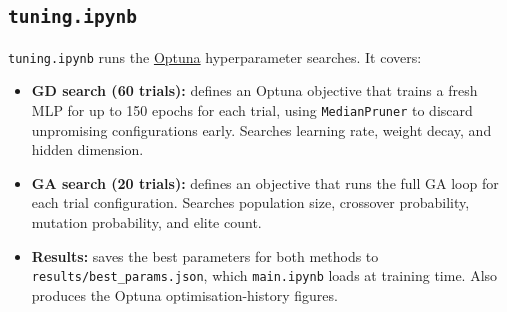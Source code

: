 \documentclass[11pt,a4paper]{article}
\begin{document}
\subsection{\texttt{tuning.ipynb}}

\texttt{tuning.ipynb} runs the \href{https://optuna.org}{Optuna} hyperparameter searches. It
covers:
\begin{itemize}
    \item \textbf{GD search (60 trials):} defines an Optuna objective that trains a fresh MLP for
          up to 150 epochs for each trial, using \texttt{MedianPruner} to discard unpromising
          configurations early. Searches learning rate, weight decay, and hidden dimension.
    \item \textbf{GA search (20 trials):} defines an objective that runs the full GA loop for each
          trial configuration. Searches population size, crossover probability, mutation
          probability, and elite count.
    \item \textbf{Results:} saves the best parameters for both methods to
          \texttt{results/best\_params.json}, which \texttt{main.ipynb} loads at training time.
          Also produces the Optuna optimisation-history figures.
\end{itemize}
\end{document}
